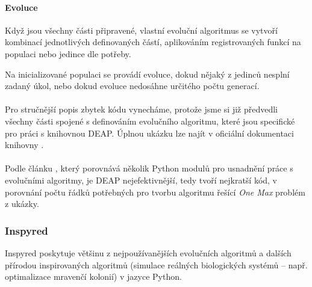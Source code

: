 \paragraph{Evoluce}
Když jsou všechny části připravené, vlastní evoluční algoritmus se vytvoří
kombinací jednotlivých definovaných částí, aplikováním registrovaných funkcí na
populaci nebo jedince dle potřeby. 

Na inicializované populaci se provádí evoluce, dokud nějaký z jedinců
nesplní zadaný úkol, nebo dokud evoluce nedosáhne určitého počtu generací. 

\paragraph{}
Pro stručnější popis zbytek kódu vynecháme, protože jsme si již předvedli
všechny části spojené s definováním evolučního algoritmu, které jsou specifické
pro práci s knihovnou DEAP. Úplnou ukázku lze najít v oficiální dokumentaci
knihovny \citep{deapproject}.

\paragraph{}
Podle článku \citep{fortin2012deap}, který porovnává několik Python modulů pro
usnadnění práce s evolučními algoritmy, je DEAP nejefektivnější,
tedy tvoří nejkratší kód, v porovnání počtu řádků potřebných pro tvorbu
algoritmu řešící \emph{One Max} problém z ukázky.

\subsubsection{Inspyred} \label{Inspyred}

Inspyred \citep{InspyredDocs} poskytuje většinu z nejpoužívanějších evolučních algoritmů a
dalších přírodou inspirovaných algoritmů (simulace reálných
biologických systémů -- např. optimalizace mravenčí kolonií) v jazyce
Python. 

